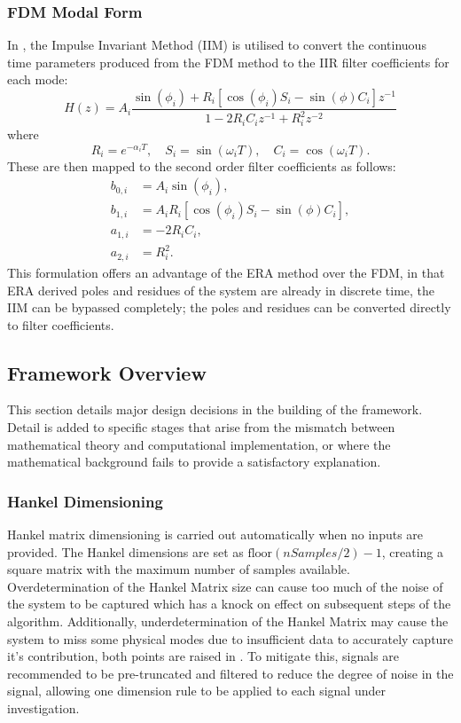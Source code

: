 \subsubsection{FDM Modal Form}
In \cite{oneill}, the Impulse Invariant Method (IIM) \cite{dsp-book} is utilised to convert the continuous time parameters produced from the FDM method to the IIR filter coefficients for each mode:
\begin{equation}
\label{iim-tf}
H(z) = A_{i} \frac{\sin(\phi_{i}) + R_{i} \left[ \cos(\phi_{i})S_{i} - \sin(\phi)C_{i}\right]z^{-1}}{1 - 2R_{i}C_{i}z^{-1} + R_{i}^{2}z^{-2}}
\end{equation}
where
\begin{equation}
\label{iim-coeff}
R_{i} = e^{-\alpha_{i}T}, \quad S_{i} = \sin(\omega_{i}T), \quad C_{i} = \cos(\omega_{i}T).
\end{equation}
These are then mapped to the second order filter coefficients as follows:
\begin{subequations}
\label{iim-iir-coeffs}
\begin{align}
    b_{0,i} &= A_{i}\sin(\phi_{i}), \\
    b_{1,i} &= A_{i}R_{i} \left[ \cos(\phi_{i})S_{i} - \sin(\phi)C_{i}\right], \\
    a_{1,i} &= -2R_{i}C_{i}, \\
    a_{2,i} &= R_{i}^2.
\end{align}
\end{subequations}
This formulation offers an advantage of the ERA method over the FDM, in that ERA derived poles and residues of the system are already in discrete time, the IIM can be bypassed completely; the poles and residues can be converted directly to filter coefficients.

\subsection{Framework Overview}
This section details major design decisions in the building of the framework. Detail is added to specific stages that arise from the mismatch between mathematical theory and computational implementation, or where the mathematical background fails to provide a satisfactory explanation.

\subsubsection{Hankel Dimensioning}
Hankel matrix dimensioning is carried out automatically when no inputs are provided. The Hankel dimensions are set as $\text{floor}(nSamples / 2) - 1$, creating a square matrix with the maximum number of samples available. Overdetermination of the Hankel Matrix size can cause too much of the noise of the system to be captured which has a knock on effect on subsequent steps of the algorithm. Additionally, underdetermination of the Hankel Matrix may cause the system to miss some physical modes due to insufficient data to accurately capture it's contribution, both points are raised in \cite{dafx2026}. To mitigate this, signals are recommended to be pre-truncated and filtered to reduce the degree of noise in the signal, allowing one dimension rule to be applied to each signal under investigation.

